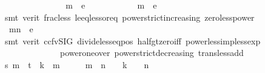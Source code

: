 \begin{isabellebody}
\ \ \ \ \ \ \ \ \isamarkupfalse%
\ \isamarkupfalse%
\ {\isachardoublequoteopen}{}\ {\isacharslash}{\kern0pt}\ {}\ {\isacharcircum}{\kern0pt}\ m{\isacharprime}{\kern0pt}\ {\isacharless}{\kern0pt}\ e{\isachardoublequoteclose}\isanewline
\ \ \ \ \ \ \ \ \ \ \isamarkupfalse%
\ {\isacartoucheopen}{}{\isacharslash}{\kern0pt}{}{\isacharcircum}{\kern0pt}m\ {\isacharless}{\kern0pt}\ e{\isacartoucheclose}\isanewline
\ \ \ \ \ \ \ \ \ \ \isamarkupfalse%
\ {\isacharparenleft}{\kern0pt}smt\ {\isacharparenleft}{\kern0pt}verit{\isacharparenright}{\kern0pt}\ frac{\isacharunderscore}{\kern0pt}less{}\ le{\isacharunderscore}{\kern0pt}eq{\isacharunderscore}{\kern0pt}less{\isacharunderscore}{\kern0pt}or{\isacharunderscore}{\kern0pt}eq\ power{\isacharunderscore}{\kern0pt}strict{\isacharunderscore}{\kern0pt}increasing\ zero{\isacharunderscore}{\kern0pt}less{\isacharunderscore}{\kern0pt}power{\isacharparenright}{\kern0pt}\isanewline
\ \ \ \ \ \ \ \ \isamarkupfalse%
\ \isamarkupfalse%
\ {\isachardoublequoteopen}{}{\isacharslash}{\kern0pt}\ {}{\isacharcircum}{\kern0pt}{\isacharparenleft}{\kern0pt}m{\isacharprime}{\kern0pt}{\isacharplus}{\kern0pt}n{\isacharplus}{\kern0pt}{}{\isacharparenright}{\kern0pt}\ {\isacharless}{\kern0pt}\ e{\isachardoublequoteclose}\isanewline
\ \ \ \ \ \ \ \ \ \ \isamarkupfalse%
\ {\isacharparenleft}{\kern0pt}smt\ {\isacharparenleft}{\kern0pt}verit{\isacharcomma}{\kern0pt}\ ccfv{\isacharunderscore}{\kern0pt}SIG{\isacharparenright}{\kern0pt}\ divide{\isacharunderscore}{\kern0pt}less{\isacharunderscore}{\kern0pt}eq{\isacharunderscore}{\kern0pt}{}{\isacharunderscore}{\kern0pt}pos\ half{\isacharunderscore}{\kern0pt}gt{\isacharunderscore}{\kern0pt}zero{\isacharunderscore}{\kern0pt}iff\ power{\isacharunderscore}{\kern0pt}less{\isacharunderscore}{\kern0pt}imp{\isacharunderscore}{\kern0pt}less{\isacharunderscore}{\kern0pt}exp\ \isanewline
\ \ \ \ \ \ \ \ \ \ \ \ \ \ power{\isacharunderscore}{\kern0pt}one{\isacharunderscore}{\kern0pt}over\ power{\isacharunderscore}{\kern0pt}strict{\isacharunderscore}{\kern0pt}decreasing\ trans{\isacharunderscore}{\kern0pt}less{\isacharunderscore}{\kern0pt}add{}{\isacharparenright}{\kern0pt}\isanewline
\ \ \ \ \ \ \ \ \isamarkupfalse%
\ {\isachardoublequoteopen}s\ m{\isacharprime}{\kern0pt}\ {\isacharminus}{\kern0pt}\ t\ {\isacharequal}{\kern0pt}\ {\isacharparenleft}{\kern0pt}k\ {\isacharasterisk}{\kern0pt}\ {}{\isacharcircum}{\kern0pt}{\isacharparenleft}{\kern0pt}m{\isacharprime}{\kern0pt}{\isacharplus}{\kern0pt}{}{\isacharparenright}{\kern0pt}\ {\isacharminus}{\kern0pt}\ {}{\isacharparenright}{\kern0pt}\ {\isacharslash}{\kern0pt}\ {}\ {\isacharcircum}{\kern0pt}\ {\isacharparenleft}{\kern0pt}m{\isacharprime}{\kern0pt}\ {\isacharplus}{\kern0pt}\ n\ {\isacharplus}{\kern0pt}\ {}{\isacharparenright}{\kern0pt}\ {\isacharminus}{\kern0pt}\ k\ {\isacharslash}{\kern0pt}\ {}\ {\isacharcircum}{\kern0pt}\ n{\isachardoublequoteclose}\isanewline

\end{isabellebody}
